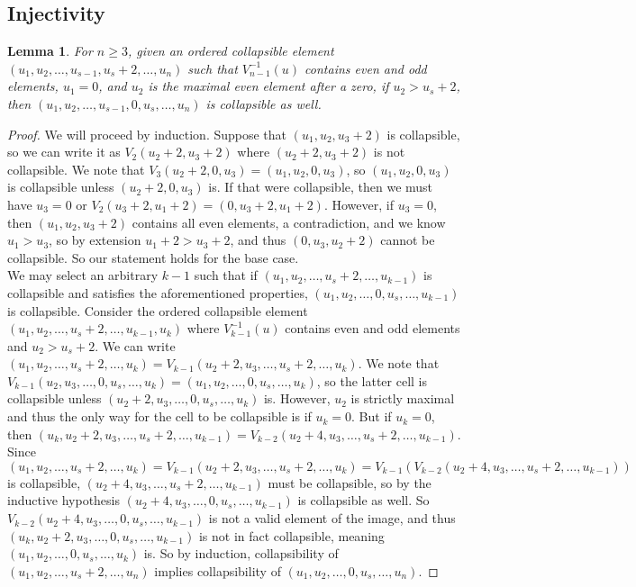 \documentclass{amsart}
\newtheorem{lemma}[theorem]{Lemma}
\begin{document}
\subsection{Injectivity}
\begin{lemma}\label{realLemma}
	For $n \geq 3$, given an ordered collapsible element $(u_1,u_2,\ldots,u_{s-1},u_s+2,\ldots,u_n)$ such that $V_{n-1}^{-1}(u)$ contains even and odd elements, $u_1=0$, and $u_2$ is the maximal even element after a zero, if $u_2 > u_s+2$, then $(u_1,u_2,\ldots,u_{s-1},0,u_s,\ldots,u_n)$ is collapsible as well.
\end{lemma}
\begin{proof}We will proceed by induction. Suppose that $(u_1,u_2,u_3+2)$ is collapsible, so we can write it as $V_2(u_2+2,u_3+2)$ where $(u_2+2,u_3+2)$ is not collapsible. We note that $V_3(u_2+2,0,u_3)=(u_1,u_2,0,u_3)$, so $(u_1,u_2,0,u_3)$ is collapsible unless $(u_2+2,0,u_3)$ is. If that were collapsible, then we must have $u_3=0$ or $V_2(u_3+2,u_1+2)=(0,u_3+2,u_1+2)$. However, if $u_3=0$, then $(u_1,u_2,u_3+2)$ contains all even elements, a contradiction, and we know $u_1>u_3$, so by extension $u_1+2>u_3+2$, and thus $(0,u_3,u_2+2)$ cannot be collapsible. So our statement holds for the base case. \\
	We may select an arbitrary $k-1$ such that if $(u_1,u_2,\ldots,u_s+2,\ldots,u_{k-1})$ is collapsible and satisfies the aforementioned properties, $(u_1,u_2,\ldots,0,u_s,\ldots,u_{k-1})$ is collapsible. Consider the ordered collapsible element $(u_1,u_2,\ldots,u_s+2,\ldots,u_{k-1},u_k)$ where $V_{k-1}^{-1}(u)$ contains even and odd elements and $u_2 > u_s+2$. We can write $(u_1,u_2,\ldots,u_s+2,\ldots,u_k)=V_{k-1}(u_2+2,u_3,\ldots,u_s+2,\ldots,u_k)$. We note that $V_{k-1}(u_2,u_3,\ldots,0,u_s,\ldots,u_k)=(u_1,u_2,\ldots,0,u_s,\ldots,u_k)$, so the latter cell is collapsible unless $(u_2+2,u_3,\ldots,0,u_s,\ldots,u_k)$ is. However, $u_2$ is strictly maximal and thus the only way for the cell to be collapsible is if $u_k=0$. But if $u_k=0$, then $(u_k,u_2+2,u_3,\ldots,u_s+2,\ldots,u_{k-1})=V_{k-2}(u_2+4,u_3,\ldots,u_s+2,\ldots,u_{k-1})$.  Since $(u_1,u_2,\ldots,u_s+2,\ldots,u_k)=V_{k-1}(u_2+2,u_3,\ldots,u_s+2,\ldots,u_k)=V_{k-1}(V_{k-2}(u_2+4,u_3,\ldots,u_s+2,\ldots,u_{k-1}))$ is collapsible, $(u_2+4,u_3,\ldots,u_s+2,\ldots,u_{k-1})$ must be collapsible, so by the inductive hypothesis $(u_2+4,u_3,\ldots,0,u_s,\ldots,u_{k-1})$ is collapsible as well. So $V_{k-2}(u_2+4,u_3,\ldots,0,u_s,\ldots,u_{k-1})$ is not a valid element of the image, and thus $(u_k,u_2+2,u_3,\ldots,0,u_s,\ldots,u_{k-1})$ is not in fact collapsible, meaning $(u_1,u_2,\ldots,0,u_s,\ldots,u_k)$ is. So by induction, collapsibility of $(u_1,u_2,\ldots,u_s+2,\ldots,u_n)$ implies collapsibility of $(u_1,u_2,\ldots,0,u_s,\ldots,u_n)$. 
\end{proof}
\end{document}
